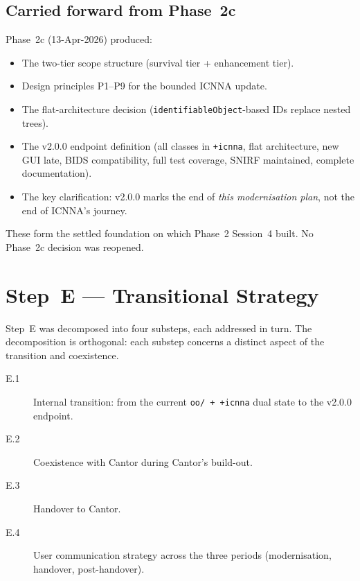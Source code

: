 \documentclass[11pt,a4paper]{article}
\begin{document}
\vspace{0.5em}

\subsection{Carried forward from Phase~2c}

Phase~2c (13-Apr-2026) produced:

\begin{itemize}
    \item The two-tier scope structure (survival tier + enhancement tier).
    \item Design principles P1--P9 for the bounded ICNNA update.
    \item The flat-architecture decision (\texttt{identifiableObject}-based IDs replace nested trees).
    \item The v2.0.0 endpoint definition (all classes in \texttt{+icnna}, flat architecture, new GUI late, BIDS compatibility, full test coverage, SNIRF maintained, complete documentation).
    \item The key clarification: v2.0.0 marks the end of \emph{this modernisation plan}, not the end of ICNNA's journey.
\end{itemize}

These form the settled foundation on which Phase~2 Session~4 built. No Phase~2c decision was reopened.

\section{Step~E --- Transitional Strategy}

Step~E was decomposed into four substeps, each addressed in turn. The decomposition is orthogonal: each substep concerns a distinct aspect of the transition and coexistence.

\begin{description}
    \item[E.1] Internal transition: from the current \texttt{oo/ + +icnna} dual state to the v2.0.0 endpoint.
    \item[E.2] Coexistence with Cantor during Cantor's build-out.
    \item[E.3] Handover to Cantor.
    \item[E.4] User communication strategy across the three periods (modernisation, handover, post-handover).
\end{description}
\end{document}
